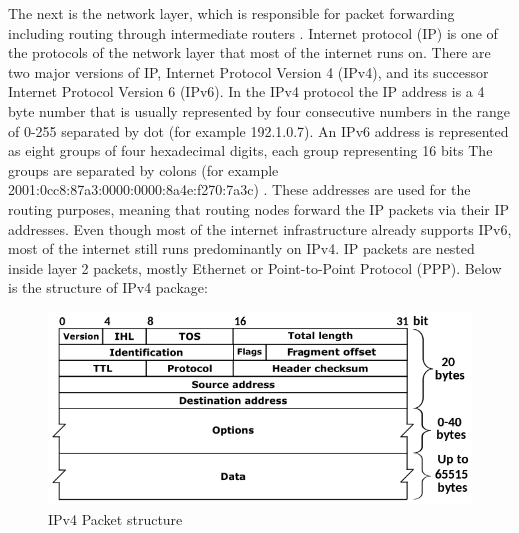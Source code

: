 The next is the network layer, which is responsible for packet forwarding including routing through intermediate routers \cite{data-link-layer}. Internet protocol (IP) is one of the protocols of the network layer that most of the internet runs on. There are two major versions of IP, Internet Protocol Version 4 (IPv4), and its successor Internet Protocol Version 6 (IPv6). In the IPv4 protocol the IP address is a 4 byte number that is usually represented by four consecutive numbers in the range of 0-255 separated by dot (for example 192.1.0.7). An IPv6 address is represented as eight groups of four hexadecimal digits, each group representing 16 bits The groups are separated by colons (for example 2001:0cc8:87a3:0000:0000:8a4e:f270:7a3c) \cite{ipv6-arch}. These addresses are used for the routing purposes, meaning that routing nodes forward the IP packets via their IP addresses. Even though most of the internet infrastructure already supports IPv6, most of the internet still runs predominantly on IPv4. IP packets are nested inside layer 2 packets, mostly Ethernet or Point-to-Point Protocol (PPP). Below is the structure of IPv4 package: 

\begin{figure}[htp]
\begin{center}
\includegraphics[width=1\textwidth]{IPv4-Packet.png}
\end{center}
\caption{IPv4 Packet structure}
\label{ethernet-port}
\end{figure}

